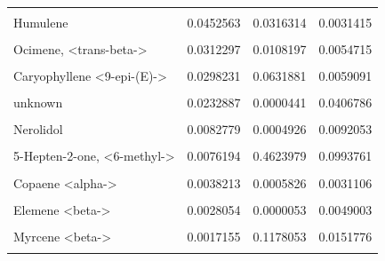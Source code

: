 \documentclass[12pt,final,CPage]{ufthesis}
\begin{document}
{\begin{table}
{\begin{tabular}[t]{lrrr}
  \cellcolor{gray!6}{Calamenene} & \cellcolor{gray!6}{0.0527682} & \cellcolor{gray!6}{0.5593544} & \cellcolor{gray!6}{0.1657161}\\
  Humulene & 0.0452563 & 0.0316314 & 0.0031415\\
  \cellcolor{gray!6}{Aromadendrene} & \cellcolor{gray!6}{0.0383456} & \cellcolor{gray!6}{0.0126573} & \cellcolor{gray!6}{0.0399404}\\
  Ocimene, <trans-beta-> & 0.0312297 & 0.0108197 & 0.0054715\\
  \addlinespace
  \cellcolor{gray!6}{2-Hexenal} & \cellcolor{gray!6}{0.0304577} & \cellcolor{gray!6}{0.0046560} & \cellcolor{gray!6}{0.0224511}\\
  Caryophyllene <9-epi-(E)-> & 0.0298231 & 0.0631881 & 0.0059091\\
  \cellcolor{gray!6}{2,4,6-Octatriene, 2,6-dimethyl-, (E,Z)-} & \cellcolor{gray!6}{0.0233474} & \cellcolor{gray!6}{0.0270255} & \cellcolor{gray!6}{0.0009908}\\
  unknown & 0.0232887 & 0.0000441 & 0.0406786\\
  \cellcolor{gray!6}{Camphor} & \cellcolor{gray!6}{0.0107637} & \cellcolor{gray!6}{0.0000204} & \cellcolor{gray!6}{0.0188011}\\
  \addlinespace
  Nerolidol & 0.0082779 & 0.0004926 & 0.0092053\\
  \cellcolor{gray!6}{Farnesene <(E)-, beta->} & \cellcolor{gray!6}{0.0079276} & \cellcolor{gray!6}{0.0000150} & \cellcolor{gray!6}{0.0138472}\\
  5-Hepten-2-one, <6-methyl-> & 0.0076194 & 0.4623979 & 0.0993761\\
  \cellcolor{gray!6}{Trivertal} & \cellcolor{gray!6}{0.0060998} & \cellcolor{gray!6}{0.3219597} & \cellcolor{gray!6}{0.0388516}\\
  Copaene <alpha-> & 0.0038213 & 0.0005826 & 0.0031106\\
  \addlinespace
  \cellcolor{gray!6}{Mesitylene} & \cellcolor{gray!6}{0.0036797} & \cellcolor{gray!6}{0.0431734} & \cellcolor{gray!6}{0.0303253}\\
  Elemene <beta-> & 0.0028054 & 0.0000053 & 0.0049003\\
  \cellcolor{gray!6}{Benzaldehyde <para-ethyl->} & \cellcolor{gray!6}{0.0021270} & \cellcolor{gray!6}{0.0000040} & \cellcolor{gray!6}{0.0037366}\\
  Myrcene <beta-> & 0.0017155 & 0.1178053 & 0.0151776\\
  \cellcolor{gray!6}{2-Thujene} & \cellcolor{gray!6}{0.0016199} & \cellcolor{gray!6}{0.0705489} & \cellcolor{gray!6}{0.0080563}\\

\end{tabular}}
\end{table}}
\end{document}
